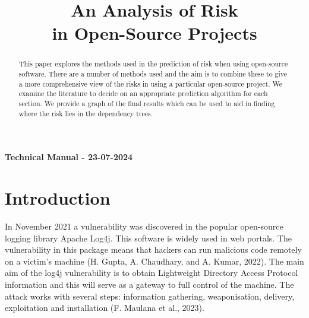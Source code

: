 \documentclass[10pt, onecolumn]{IEEEtran}
\begin{document}
\title{An Analysis of Risk\\ in Open-Source Projects}

\author{
\and
{}}

\maketitle

\begin{description}
    \item[]
    \begin{center}
        \item[\textbf{Technical Manual - 23-07-2024}] 
        \end{center}
    \item[]
\end{description}



\begin{abstract}
\begin{addmargin}[4em]{4em}
This paper explores the methods used in the prediction of risk when using open-source software. There are a number of methods used and the aim is to combine these to give a more comprehensive view of the risks in using a particular open-source project. We examine the literature to decide on an appropriate prediction algorithm for each section. We provide a graph of the final results which can be used to aid in finding where the risk lies in the dependency trees. 
\end{addmargin}
\end{abstract}


\section{Introduction}
In November 2021 a vulnerability was discovered in the popular open-source logging library Apache Log4j. This software is widely used in web portals. The vulnerability in this package means that hackers can run malicious code remotely on a victim's machine (H. Gupta, A. Chaudhary, and A. Kumar, 2022). The main aim of the log4j vulnerability is to obtain Lightweight Directory Access Protocol information and this will serve as a gateway to full control of the machine. The attack works with several steps: information gathering, weaponisation, delivery, exploitation and installation (F. Maulana et al., 2023). 
\end{document}

